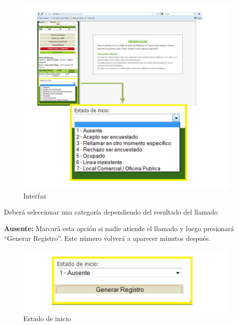 \documentclass[
  openany]{book}
\begin{document}
\begin{figure}

{\centering \includegraphics[width=1\linewidth]{imagenes/figura6-27} 

}

\caption{Interfaz}\label{fig:interfa1}
\end{figure}

Deberá seleccionar una categoría dependiendo del resultado del llamado

\textbf{Ausente:} Marcará esta opción si nadie atiende el llamado y luego presionará ``Generar Registro''. Este número volverá a aparecer minutos después.

\begin{figure}

{\centering \includegraphics[width=1\linewidth]{imagenes/figura6-28} 

}

\caption{Estado de inicio}\label{fig:estadode3}
\end{figure}
\end{document}
